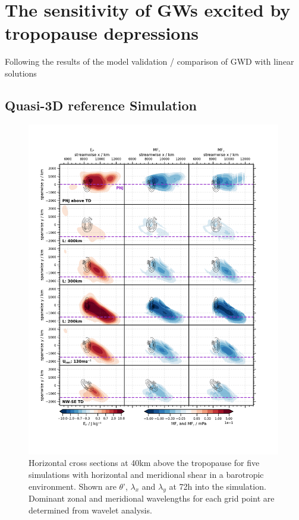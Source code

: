 \section{The sensitivity of GWs excited by tropopause depressions}
\label{sec:resultsQ3D}


Following the results of the model validation / comparison of GWD with linear solutions




\subsection{Quasi-3D reference Simulation}
\label{sec:resultsq3D-reference}

\begin{figure}[]
    \centering
    \includegraphics[width=0.99\textwidth]{figures_3D/waveletAna_fluxes_obs.png}
    \caption{Horizontal cross sections at 40km above the tropopause for five simulations with horizontal and meridional shear in a barotropic environment. Shown are $\theta$', $\lambda_x$ and $\lambda_y$ at 72h into the simulation. Dominant zonal and meridional wavelengths for each grid point are determined from wavelet analysis.}
    \label{fig:waveletAna_dudy}
\end{figure}

